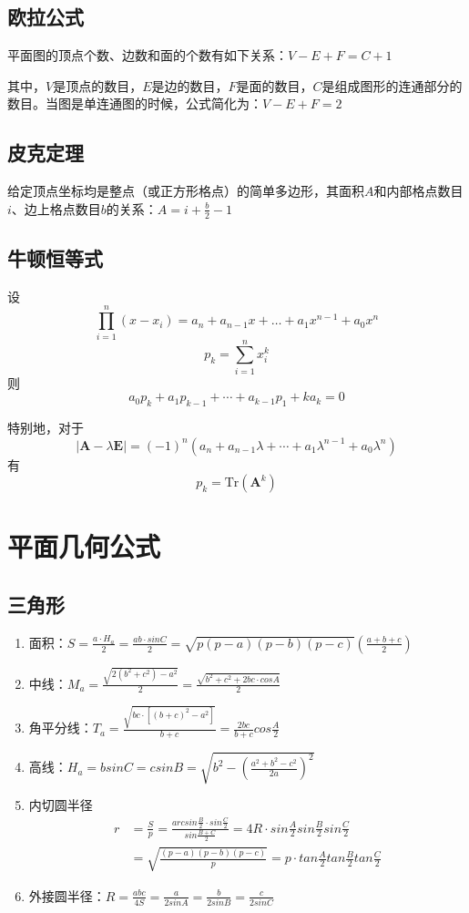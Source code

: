\begin{spacing}{0.1}
\subsection*{欧拉公式}
	平面图的顶点个数、边数和面的个数有如下关系：$\displaystyle V - E + F = C+ 1$\par
	其中，$V$是顶点的数目，$E$是边的数目，$F$是面的数目，$C$是组成图形的连通部分的数目。当图是单连通图的时候，公式简化为：$\displaystyle V - E + F = 2$
\subsection*{皮克定理}
	给定顶点坐标均是整点（或正方形格点）的简单多边形，其面积$A$和内部格点数目$i$、边上格点数目$b$的关系：$A = i + \frac{b}{2} - 1$
\subsection*{牛顿恒等式}
	设$$\prod_{i = 1}^n{(x - x_i)} = a_n + a_{n - 1} x + \dots + a_1 x^{n - 1} + a_0 x^n$$
	$$p_k = \sum_{i = 1}^n{x_i^k}$$
	则$$a_0 p_k + a_1 p_{k - 1} + \cdots + a_{k - 1} p_1 + k a_k = 0$$\par
	特别地，对于$$|\bm{A} - \lambda \bm{E}| = (-1)^n(a_n + a_{n - 1} \lambda + \cdots + a_1 \lambda^{n - 1} + a_0 \lambda^n)$$
	有$$p_k = \mathrm{Tr}(\bm{A}^k)$$
\section{平面几何公式}
\subsection*{三角形}
\begin{spacing}{0.1}
	\begin{enumerate}
		\item 面积：$\displaystyle S=\frac{a \cdot H_a}{2}=\frac{ab \cdot sinC}{2}=\sqrt{p(p-a)(p-b)(p-c)}\left(\frac{a + b + c}{2}\right)$
		\item 中线：$\displaystyle M_a=\frac{\sqrt{2(b^2+c^2)-a^2}}{2}=\frac{\sqrt{b^2+c^2+2bc \cdot cosA}}{2}$
		\item 角平分线：$\displaystyle T_a=\frac{\sqrt{bc \cdot [(b+c)^2-a^2]}}{b+c}=\frac{2bc}{b+c}cos\frac{A}{2}$
		\item 高线：$\displaystyle H_a=bsinC=csinB=\sqrt{b^2-(\frac{a^2+b^2-c^2}{2a})^2}$
		\item 内切圆半径
			\begin{align*}
				r&=\frac{S}{p}=\frac{arcsin\frac{B}{2} \cdot sin\frac{C}{2}}{sin\frac{B+C}{2}}=4R \cdot sin\frac{A}{2}sin\frac{B}{2}sin\frac{C}{2}\\
				&=\sqrt{\frac{(p-a)(p-b)(p-c)}{p}}=p \cdot tan\frac{A}{2}tan\frac{B}{2}tan\frac{C}{2}
			\end{align*}
		\item 外接圆半径：$\displaystyle R=\frac{abc}{4S}=\frac{a}{2sinA}=\frac{b}{2sinB}=\frac{c}{2sinC}$
	\end{enumerate}
\end{spacing}

\end{spacing}
